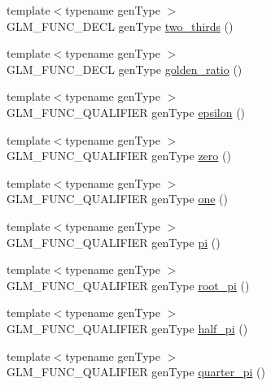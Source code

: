 \begin{DoxyCompactItemize}
\item 
{\footnotesize template$<$typename gen\+Type $>$ }\\G\+L\+M\+\_\+\+F\+U\+N\+C\+\_\+\+D\+E\+CL gen\+Type \hyperlink{group__gtc__constants_gadde7f2efce3b14c8b26944fbafed4a10}{two\+\_\+thirds} ()
\item 
{\footnotesize template$<$typename gen\+Type $>$ }\\G\+L\+M\+\_\+\+F\+U\+N\+C\+\_\+\+D\+E\+CL gen\+Type \hyperlink{group__gtc__constants_gafd53093ef2d756333865d774bea3cdf9}{golden\+\_\+ratio} ()
\item 
{\footnotesize template$<$typename gen\+Type $>$ }\\G\+L\+M\+\_\+\+F\+U\+N\+C\+\_\+\+Q\+U\+A\+L\+I\+F\+I\+ER gen\+Type \hyperlink{group__gtc__constants_gacb41049b8d22c8aa90e362b96c524feb}{epsilon} ()
\item 
{\footnotesize template$<$typename gen\+Type $>$ }\\G\+L\+M\+\_\+\+F\+U\+N\+C\+\_\+\+Q\+U\+A\+L\+I\+F\+I\+ER gen\+Type \hyperlink{group__gtc__constants_ga5cc97dd01d37fc199264ff6030578435}{zero} ()
\item 
{\footnotesize template$<$typename gen\+Type $>$ }\\G\+L\+M\+\_\+\+F\+U\+N\+C\+\_\+\+Q\+U\+A\+L\+I\+F\+I\+ER gen\+Type \hyperlink{group__gtc__constants_ga8186ec2c330457d41d9686c47cd3b2d1}{one} ()
\item 
{\footnotesize template$<$typename gen\+Type $>$ }\\G\+L\+M\+\_\+\+F\+U\+N\+C\+\_\+\+Q\+U\+A\+L\+I\+F\+I\+ER gen\+Type \hyperlink{group__gtc__constants_gae671930537266a9a650ccb4b88757692}{pi} ()
\item 
{\footnotesize template$<$typename gen\+Type $>$ }\\G\+L\+M\+\_\+\+F\+U\+N\+C\+\_\+\+Q\+U\+A\+L\+I\+F\+I\+ER gen\+Type \hyperlink{group__gtc__constants_ga1cfeb345f34f72697d14f4db8d5d4c6c}{root\+\_\+pi} ()
\item 
{\footnotesize template$<$typename gen\+Type $>$ }\\G\+L\+M\+\_\+\+F\+U\+N\+C\+\_\+\+Q\+U\+A\+L\+I\+F\+I\+ER gen\+Type \hyperlink{group__gtc__constants_ga7f7a1050729f3b03b1873a06ba4a472f}{half\+\_\+pi} ()
\item 
{\footnotesize template$<$typename gen\+Type $>$ }\\G\+L\+M\+\_\+\+F\+U\+N\+C\+\_\+\+Q\+U\+A\+L\+I\+F\+I\+ER gen\+Type \hyperlink{group__gtc__constants_ga0148d757b4bfda4d86251b8d1ea1dad3}{quarter\+\_\+pi} ()
\item 

\end{DoxyCompactItemize}
